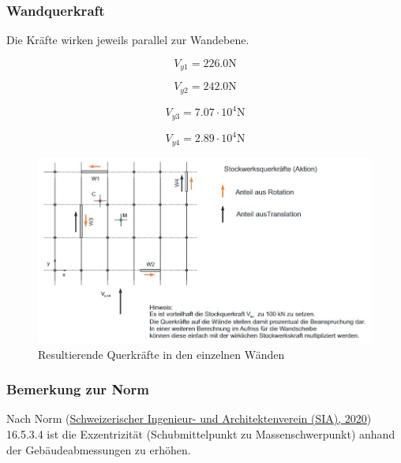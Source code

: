 \documentclass[
  letterpaper,
  DIV=11]{scrreprt}
\begin{document}
\hypertarget{wandquerkraft}{%
\subsubsection{Wandquerkraft}\label{wandquerkraft}}

Die Kräfte wirken jeweils parallel zur Wandebene.

\begin{equation*}V_{y1} = 226.0 \text{N}\end{equation*}

\begin{equation*}V_{y2} = 242.0 \text{N}\end{equation*}

\begin{equation*}V_{y3} = 7.07 \cdot 10^{4} \text{N}\end{equation*}

\begin{equation*}V_{y4} = 2.89 \cdot 10^{4} \text{N}\end{equation*}

\begin{figure}[H]

{\centering \includegraphics{bilder/ekv3.jpg}

}

\caption{\label{fig-V_waende}Resultierende Querkräfte in den einzelnen
Wänden}

\end{figure}

\hypertarget{bemerkung-zur-norm}{%
\subsubsection{Bemerkung zur Norm}\label{bemerkung-zur-norm}}

Nach Norm (\protect\hyperlink{ref-SIA261_2020}{Schweizerischer
Ingenieur- und Architektenverein (SIA), 2020}) 16.5.3.4 ist die
Exzentrizität (Schubmittelpunkt zu Massenschwerpunkt) anhand der
Gebäudeabmessungen zu erhöhen.
\end{document}
